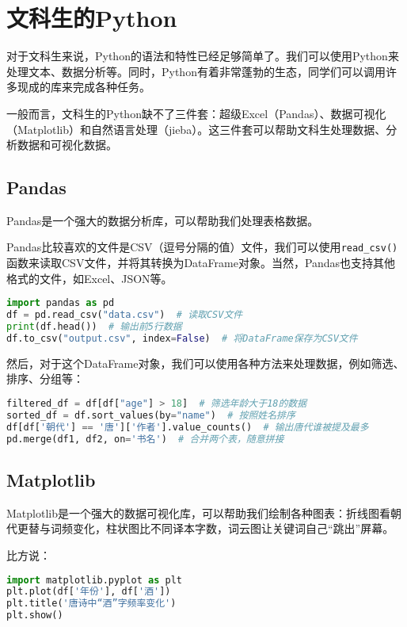 \documentclass[../main.tex]{subfiles}
\begin{document}
\section{文科生的Python}

对于文科生来说，Python的语法和特性已经足够简单了。我们可以使用Python来处理文本、数据分析等。同时，Python有着非常蓬勃的生态，同学们可以调用许多现成的库来完成各种任务。

一般而言，文科生的Python缺不了三件套：超级Excel（Pandas）、数据可视化（Matplotlib）和自然语言处理（jieba）。这三件套可以帮助文科生处理数据、分析数据和可视化数据。

\subsection{Pandas}

Pandas是一个强大的数据分析库，可以帮助我们处理表格数据。

Pandas比较喜欢的文件是CSV（逗号分隔的值）文件，我们可以使用\texttt{read\_csv()}函数来读取CSV文件，并将其转换为DataFrame对象。当然，Pandas也支持其他格式的文件，如Excel、JSON等。

\begin{lstlisting}[language=python]
import pandas as pd
df = pd.read_csv("data.csv")  # 读取CSV文件
print(df.head())  # 输出前5行数据
df.to_csv("output.csv", index=False)  # 将DataFrame保存为CSV文件
\end{lstlisting}

然后，对于这个DataFrame对象，我们可以使用各种方法来处理数据，例如筛选、排序、分组等：
\begin{lstlisting}[language=python]
filtered_df = df[df["age"] > 18]  # 筛选年龄大于18的数据
sorted_df = df.sort_values(by="name")  # 按照姓名排序
df[df['朝代'] == '唐']['作者'].value_counts()  # 输出唐代谁被提及最多
pd.merge(df1, df2, on='书名')  # 合并两个表，随意拼接
\end{lstlisting}

\subsection{Matplotlib}

Matplotlib是一个强大的数据可视化库，可以帮助我们绘制各种图表：折线图看朝代更替与词频变化，柱状图比不同译本字数，词云图让关键词自己“跳出”屏幕。

比方说：
\begin{lstlisting}[language=python]
import matplotlib.pyplot as plt
plt.plot(df['年份'], df['酒'])
plt.title('唐诗中“酒”字频率变化')
plt.show()
\end{lstlisting}
\end{document}
